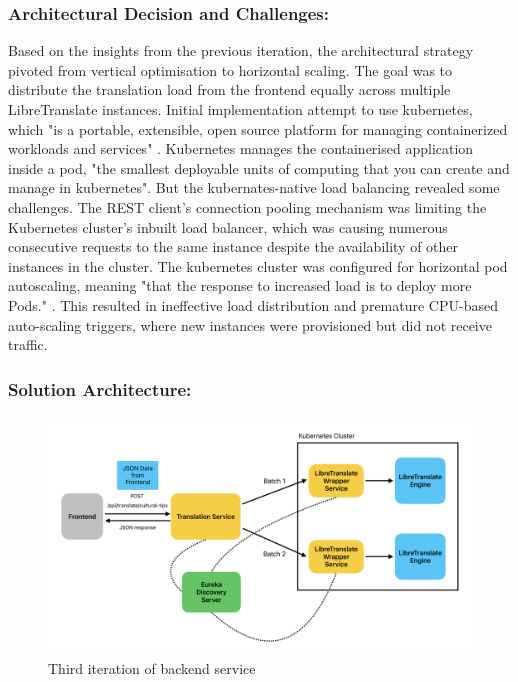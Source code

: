 \subsubsection{Architectural Decision and Challenges:} Based on the insights from the previous iteration, the architectural strategy pivoted from vertical optimisation to horizontal scaling. The goal was to distribute the translation load from the frontend equally across multiple LibreTranslate instances. Initial implementation attempt to use kubernetes, which "is a portable, extensible, open source platform for managing containerized workloads and services" \cite{kubernetes_overview}\cite{burns2022kubernetes}. Kubernetes manages the containerised application inside a pod, "the smallest deployable units of computing that you can create and manage in kubernetes"\cite{kubernetes_pods}. But the kubernates-native load balancing revealed some challenges. The REST client's connection pooling mechanism was limiting the Kubernetes cluster's inbuilt load balancer\cite{kubernetes_services_networking}\cite{redhat_kubernetes_cluster}, which was causing numerous consecutive requests to the same instance despite the availability of other instances in the cluster\cite{expedia_load_distribution}\cite{pubsapient_uneven_distribution}. 
The kubernetes cluster was configured for horizontal pod autoscaling, meaning "that the response to increased load is to deploy more Pods." \cite{kubernetes_horizontal_pod_autoscaling}.
This resulted in ineffective load distribution and premature CPU-based auto-scaling triggers, where new instances were provisioned but did not receive traffic.

\subsubsection{Solution Architecture:}
\begin{figure}[H]
    \centering
    \includegraphics[width=1\linewidth]{images/Backend_Documents/Backend_Iteration_3.pdf}
    \caption{Third iteration of backend service}
    \label{fig:backend_iteration_3}
\end{figure}

